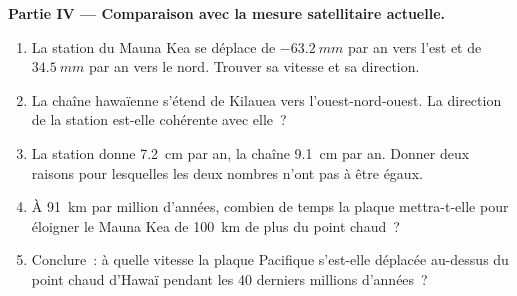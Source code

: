 \begin{problem}
\medskip
\noindent\textbf{Partie IV --- Comparaison avec la mesure satellitaire actuelle.}
\begin{enumerate}[resume]
  \item La station du Mauna Kea se déplace de $\qty{-63.2}{mm}$ par an vers
        l'est et de $\qty{+34.5}{mm}$ par an vers le nord. Trouver sa
        vitesse et sa direction.
  \item La chaîne hawaïenne s'étend de Kilauea vers l'ouest-nord-ouest. La
        direction de la station est-elle cohérente avec elle~?
  \item La station donne \qty{7.2}{cm} par an, la chaîne \qty{9.1}{cm} par
        an. Donner deux raisons pour lesquelles les deux nombres n'ont pas à
        être égaux.
  \item À \qty{91}{km} par million d'années, combien de temps la plaque
        mettra-t-elle pour éloigner le Mauna Kea de \qty{100}{km} de plus du
        point chaud~?
  \item Conclure~: à quelle vitesse la plaque Pacifique s'est-elle déplacée
        au-dessus du point chaud d'Hawaï pendant les 40 derniers millions
        d'années~?
\end{enumerate}
\end{problem}
